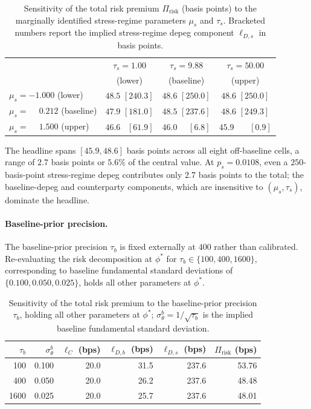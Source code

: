\begin{table}[H]
\centering
\caption{Sensitivity of the total risk premium $\Pi_{\text{risk}}$ (basis points) to the marginally identified stress-regime parameters $\mu_s$ and $\tau_s$. Bracketed numbers report the implied stress-regime depeg component $\ell_{D,s}$ in basis points.}\label{tab:sensitivity}
\begin{tabular}{lccc}
\toprule
& $\tau_s = 1.00$ & $\tau_s = 9.88$ & $\tau_s = 50.00$ \\
& (lower)         & (baseline)      & (upper)           \\
\midrule
$\mu_s = -1.000$ (lower)    & $48.5$ $[240.3]$ & $48.6$ $[250.0]$ & $48.6$ $[250.0]$ \\
$\mu_s = \phantom{-}0.212$ (baseline) & $47.9$ $[181.0]$ & $\mathbf{48.5}$ $[\mathbf{237.6}]$ & $48.6$ $[249.3]$ \\
$\mu_s = \phantom{-}1.500$ (upper)    & $46.6$ $\phantom{0}[61.9]$  & $46.0$ $\phantom{00}[6.8]$  & $45.9$ $\phantom{000}[0.9]$ \\
\bottomrule
\end{tabular}
\end{table}

The headline spans $[45.9, 48.6]$ basis points across all eight off-baseline cells, a range of $2.7$ basis points or $5.6\%$ of the central value. At $p_s = 0.0108$, even a $250$-basis-point stress-regime depeg contributes only $2.7$ basis points to the total; the baseline-depeg and counterparty components, which are insensitive to $(\mu_s, \tau_s)$, dominate the headline.

\paragraph{Baseline-prior precision.} The baseline-prior precision $\tau_b$ is fixed externally at $400$ rather than calibrated. Re-evaluating the risk decomposition at $\phi^*$ for $\tau_b \in \{100, 400, 1600\}$, corresponding to baseline fundamental standard deviations of $\{0.100, 0.050, 0.025\}$, holds all other parameters at $\phi^*$.

\begin{table}[H]
\centering
\caption{Sensitivity of the total risk premium to the baseline-prior precision $\tau_b$, holding all other parameters at $\phi^*$; $\sigma_\theta^b = 1/\sqrt{\tau_b}$ is the implied baseline fundamental standard deviation.}\label{tab:sens_tau_b}
\begin{tabular}{rrrrrr}
\toprule
$\tau_b$ & $\sigma_\theta^b$ & $\ell_C$ (bps) & $\ell_{D,b}$ (bps) & $\ell_{D,s}$ (bps) & $\Pi_{\text{risk}}$ (bps) \\
\midrule
100  & 0.100 & 20.0 & 31.5 & 237.6 & 53.76 \\
400  & 0.050 & 20.0 & 26.2 & 237.6 & 48.48 \\
1600 & 0.025 & 20.0 & 25.7 & 237.6 & 48.01 \\
\bottomrule
\end{tabular}
\end{table}

